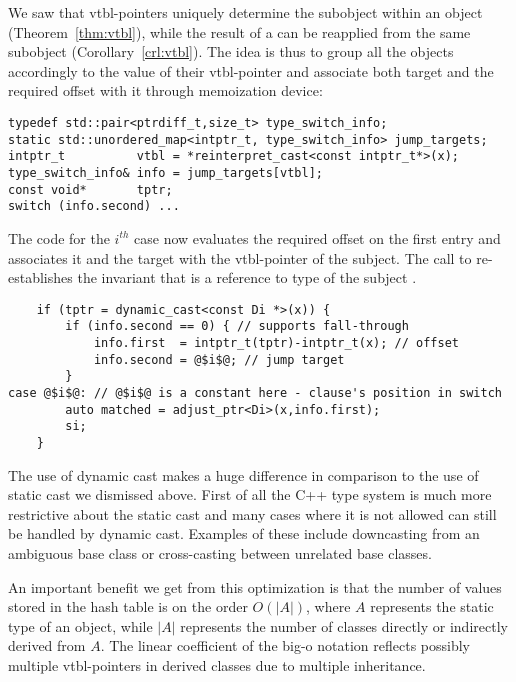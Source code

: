 We saw that vtbl-pointers uniquely determine the subobject within an object 
(Theorem~\ref{thm:vtbl}), while the result of a  can be reapplied 
from the same subobject (Corollary~\ref{crl:vtbl}). The idea is thus to group 
all the objects accordingly to the value of their vtbl-pointer and associate both 
target and the required offset with it through memoization device:

\begin{lstlisting}
typedef std::pair<ptrdiff_t,size_t> type_switch_info;
static std::unordered_map<intptr_t, type_switch_info> jump_targets;
intptr_t          vtbl = *reinterpret_cast<const intptr_t*>(x);
type_switch_info& info = jump_targets[vtbl];
const void*       tptr; 
switch (info.second) ...
\end{lstlisting}

\noindent
The code for the $i^{th}$ case now evaluates the required offset on the first 
entry and associates it and the target with the vtbl-pointer of the subject.
The call to  re-establishes the invariant that 
 is a reference to type  of the subject .

\begin{lstlisting}
    if (tptr = dynamic_cast<const Di *>(x)) {
        if (info.second == 0) { // supports fall-through
            info.first  = intptr_t(tptr)-intptr_t(x); // offset
            info.second = @$i$@; // jump target
        }
case @$i$@: // @$i$@ is a constant here - clause's position in switch
        auto matched = adjust_ptr<Di>(x,info.first); 
        si;
    }
\end{lstlisting}

\noindent
The use of dynamic cast makes a huge difference in comparison to the use of 
static cast we dismissed above. First of all the C++ type system is much more 
restrictive about the static cast and many cases where it is not allowed can 
still be handled by dynamic cast. Examples of these include downcasting from an 
ambiguous base class or cross-casting between unrelated base classes.

An important benefit we get from this optimization is that the number of values 
stored in the hash table is on the order $O(|A|)$, where $A$ represents the 
static type of an object, while $|A|$ represents the number of classes directly 
or indirectly derived from $A$. The linear coefficient of the big-o notation 
reflects possibly multiple vtbl-pointers in derived classes due to multiple 
inheritance.


